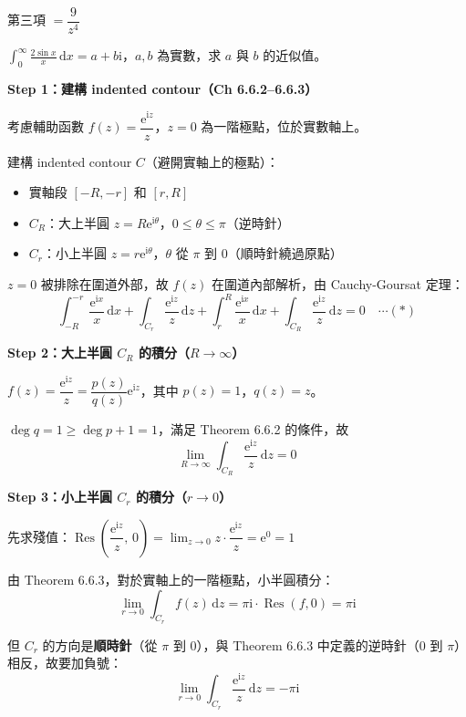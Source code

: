 \documentclass[12pt,a4paper]{article}
\newcommand{\dd}{\,\mathrm{d}}
\newcommand{\ii}{\mathrm{i}}
\newcommand{\ee}{\mathrm{e}}
\newcommand{\Res}{\operatorname{Res}}
\begin{document}
\begin{ansbox}
第三項 $=\boxed{\dfrac{9}{z^4}}$
\end{ansbox}

\begin{qbox}[第 9 題]
$\displaystyle\int_0^{\infty}\frac{2\sin x}{x}\dd{x}=a+b\ii$，$a,b$ 為實數，求 $a$ 與 $b$ 的近似值。
\end{qbox}

\begin{solbox}[解]
\textbf{Step 1：建構 indented contour（Ch 6.6.2--6.6.3）}

考慮輔助函數 $f(z)=\dfrac{\ee^{\ii z}}{z}$，$z=0$ 為一階極點，位於實數軸上。

建構 indented contour $C$（避開實軸上的極點）：
\begin{itemize}
\item 實軸段 $[-R,-r]$ 和 $[r,R]$
\item $C_R$：大上半圓 $z=R\ee^{\ii\theta}$，$0\le\theta\le\pi$（逆時針）
\item $C_r$：小上半圓 $z=r\ee^{\ii\theta}$，$\theta$ 從 $\pi$ 到 $0$（順時針繞過原點）
\end{itemize}

$z=0$ 被排除在圍道外部，故 $f(z)$ 在圍道內部解析，由 Cauchy-Goursat 定理：
$$\int_{-R}^{-r}\frac{\ee^{\ii x}}{x}\dd{x}+\int_{C_r}\frac{\ee^{\ii z}}{z}\dd{z}+\int_r^R\frac{\ee^{\ii x}}{x}\dd{x}+\int_{C_R}\frac{\ee^{\ii z}}{z}\dd{z}=0 \quad\cdots(*)$$

\textbf{Step 2：大上半圓 $C_R$ 的積分（$R\to\infty$）}

$f(z)=\dfrac{\ee^{\ii z}}{z}=\dfrac{p(z)}{q(z)}\ee^{\ii z}$，其中 $p(z)=1$，$q(z)=z$。

$\deg q=1\ge\deg p+1=1$，滿足 Theorem 6.6.2 的條件，故
$$\lim_{R\to\infty}\int_{C_R}\frac{\ee^{\ii z}}{z}\dd{z}=0$$

\textbf{Step 3：小上半圓 $C_r$ 的積分（$r\to 0$）}

先求殘值：$\Res\!\left(\dfrac{\ee^{\ii z}}{z},\,0\right)=\lim_{z\to 0}z\cdot\dfrac{\ee^{\ii z}}{z}=\ee^0=1$

由 Theorem 6.6.3，對於實軸上的一階極點，小半圓積分：
$$\lim_{r\to 0}\int_{C_r}f(z)\dd{z}=\pi\ii\cdot\Res(f,0)=\pi\ii$$

但 $C_r$ 的方向是\textbf{順時針}（從 $\pi$ 到 $0$），與 Theorem 6.6.3 中定義的逆時針（$0$ 到 $\pi$）相反，故要加負號：
$$\lim_{r\to 0}\int_{C_r}\frac{\ee^{\ii z}}{z}\dd{z}=-\pi\ii$$


\end{solbox}
\end{document}
